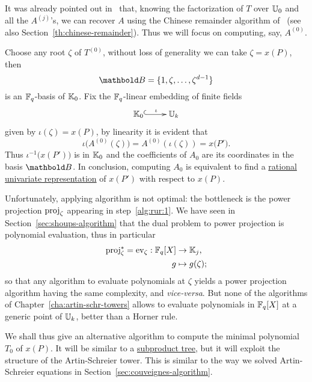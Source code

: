 It was already pointed out in~\cite[$\S$2.3]{couveignes96} that,
knowing the factorization of $T$ over $\mathbb{U}_0$ and all the $A^{(j)}$'s,
we can recover $A$ using the Chinese remainder algorithm
of~\cite[$\S10$]{vzGG} (see also
Section~\ref{th:chinese-remainder}). Thus we will focus on computing,
say, $A^{(0)}$.

Choose any root $\zeta$ of $T^{(0)}$, without loss of generality we
can take $\zeta=x(P)$, then
\begin{equation}
  \label{eq:188}
  \basis{B}=\{1,\zeta,\ldots,\zeta^{d-1}\}  
\end{equation}
is an $\mathbb{F}_q$-basis of $\mathbb{K}_0$.  Fix the $\mathbb{F}_q$-linear embedding of
finite fields
\begin{equation}
  \label{eq:embed}
  \xymatrix{
    \K_0 \ar@{^{(}->}[r]^-\iota & \U_k
  }
\end{equation}
given by $\iota(\zeta) = x(P)$, by linearity it is evident that
\begin{equation}
  \iota\bigl(A^{(0)}(\zeta)\bigr) = A^{(0)}\left(\iota(\zeta)\right)=x\bigl(P'\bigr)
  \text{.}
\end{equation}
Thus $\iota^{-1}\bigl(x(P')\bigr)$ is in $\mathbb{K}_0$ and the coefficients
of $A_0$ are its coordinates in the basis $\basis{B}$. In conclusion,
computing $A_0$ is equivalent to find a \hyperref[eq:22]{rational
  univariate representation} of $x(P')$ with respect to $x(P)$.

Unfortunately, applying algorithm  is not optimal: the
bottleneck is the power projection $\operatorname{proj}_\zeta$ appearing in
step~\ref{alg:rur:1}. We have seen in
Section~\ref{sec:shoups-algorithm} that the dual problem to power
projection is polynomial evaluation, thus in particular
\begin{equation}
  \label{eq:189}
  \begin{aligned}
    \operatorname{proj}_\zeta^\ast = \operatorname{ev}_\zeta : \mathbb{F}_q[X] &\rightarrow \mathbb{K}_j\text{,}\\
    g &\mapsto g(\zeta)\text{;}
  \end{aligned}
\end{equation}
so that any algorithm to evaluate polynomials at $\zeta$ yields a
power projection algorithm having the same complexity, and
\emph{vice-versa}. But none of the algorithms of
Chapter~\ref{cha:artin-schr-towers} allows to evaluate polynomials in
$\mathbb{F}_q[X]$ at a generic point of $\mathbb{U}_k$, better than a Horner rule.

We shall thus give an alternative algorithm to compute the minimal
polynomial $T_0$ of $x(P)$. It will be similar to a
\hyperref[sec:chin-rema-algor]{subproduct tree}, but it will exploit
the structure of the Artin-Schreier tower. This is similar to the way
we solved Artin-Schreier equations in
Section~\ref{sec:couveignes-algorithm}.


